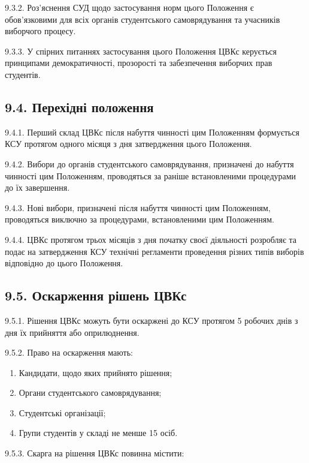     9.3.2. Роз'яснення СУД щодо застосування норм цього Положення є обов'язковими для всіх органів студентського самоврядування та учасників виборчого процесу.

    9.3.3. У спірних питаннях застосування цього Положення ЦВКс керується принципами демократичності, прозорості та забезпечення виборчих прав студентів.

\subsection*{9.4. Перехідні положення}
    9.4.1. Перший склад ЦВКс після набуття чинності цим Положенням формується КСУ протягом одного місяця з дня затвердження цього Положення.

    9.4.2. Вибори до органів студентського самоврядування, призначені до набуття чинності цим Положенням, проводяться за раніше встановленими процедурами до їх завершення.

    9.4.3. Нові вибори, призначені після набуття чинності цим Положенням, проводяться виключно за процедурами, встановленими цим Положенням.

    9.4.4. ЦВКс протягом трьох місяців з дня початку своєї діяльності розробляє та подає на затвердження КСУ технічні регламенти проведення різних типів виборів відповідно до цього Положення.

\subsection*{9.5. Оскарження рішень ЦВКс}
    9.5.1. Рішення ЦВКс можуть бути оскаржені до КСУ протягом 5 робочих днів з дня їх прийняття або оприлюднення.

    9.5.2. Право на оскарження мають:

        \begin{enumerate}[label=\alph*)]
            \item Кандидати, щодо яких прийнято рішення;
            \item Органи студентського самоврядування;
            \item Студентські організації;
            \item Групи студентів у складі не менше 15 осіб.
        \end{enumerate}

    9.5.3. Скарга на рішення ЦВКс повинна містити:

